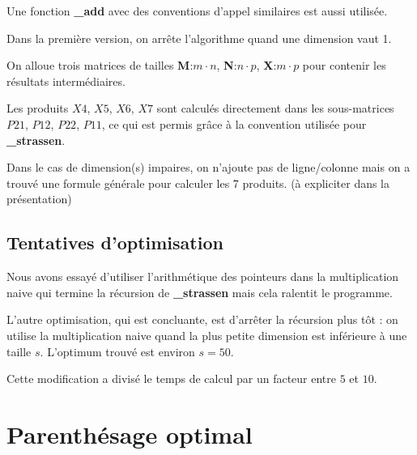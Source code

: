 \documentclass[a4paper]{article}
\begin{document}
Une fonction {\bf \_add} avec des conventions d'appel similaires
est aussi utilisée.

Dans la première version, on arrête l'algorithme quand une dimension
vaut 1.

On alloue trois matrices de tailles {\bf M}:$m \cdot n$,
{\bf N}:$n \cdot p$, {\bf X}:$m \cdot p$
pour contenir les résultats intermédiaires.

Les produits $X4$, $X5$, $X6$, $X7$ sont calculés directement dans les
sous-matrices $P21$, $P12$, $P22$, $P11$, ce qui est permis grâce
à la convention utilisée pour {\bf \_strassen}.

Dans le cas de dimension(s) impaires, on n'ajoute pas de ligne/colonne
mais on a trouvé une formule générale pour calculer les 7 produits.
(à expliciter dans la présentation)

\subsection{Tentatives d'optimisation}

Nous avons essayé d'utiliser l'arithmétique des pointeurs dans la
multiplication naive qui termine la récursion de {\bf \_strassen}
mais cela ralentit le programme.

L'autre optimisation, qui est concluante, est d'arrêter la récursion
plus tôt : on utilise la multiplication naive 
quand la plus petite dimension est inférieure à une taille
$s$. L'optimum trouvé est environ $s=50$.

Cette modification a divisé le temps de calcul
par un facteur entre $5$ et $10$.

\section{Parenthésage optimal}
\end{document}
